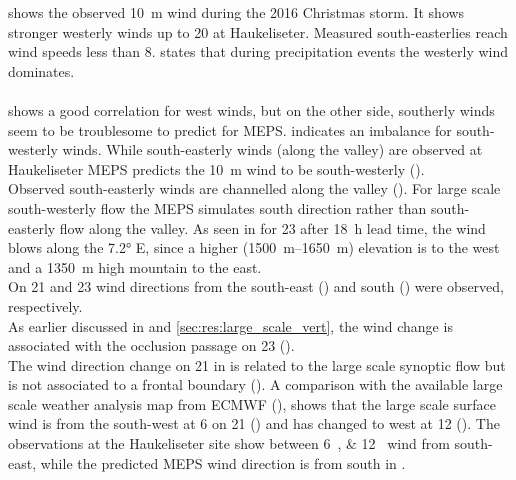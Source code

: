 \noindent
{} shows the observed \SI{10}{\metre} wind during the 2016 Christmas storm. It shows stronger westerly winds up to \SI{20}{\mPs} at Haukeliseter. Measured south-easterlies reach wind speeds less than \SI{8}{\mPs}. \citet{wolff_new_2010} states that during precipitation events the westerly wind dominates.
\\
\\
 shows a good correlation for west winds, but on the other side, southerly winds seem to be troublesome to predict for MEPS. 
 indicates an imbalance for south-westerly winds. While south-easterly winds (along the valley) are observed at Haukeliseter MEPS predicts the \SI{10}{\metre} wind to be south-westerly (). 
\\
Observed south-easterly winds are channelled along the valley (). %
For large scale south-westerly flow the MEPS simulates south direction rather than 
south-easterly flow along the valley. As seen in  for \SI{23}{\dec} after \SI{18}{\hour} lead time, the wind blows along the \ang{7.2} E, since a higher (\SIrange{1500}{1650}{\metre}) elevation is to the west and a \SI{1350}{\metre} high mountain to the east.
\\
On \num{21} and \SI{23}{\dec} wind directions from the south-east () and south () were observed, respectively.
\\
As earlier discussed in  and \ref{sec:res:large_scale_vert}, the wind change is associated with the occlusion passage on \SI{23}{\dec} ().
\\
The wind direction change on \SI{21}{\dec} in  is related to the large scale synoptic flow but is not associated to a frontal boundary (). A comparison with the available large scale weather analysis map from ECMWF (), shows that the large scale surface wind is from the south-west at \SI{6}{\UTC} on \SI{21}{\dec} () and has changed to west at \SI{12}{\UTC} (). The observations at the Haukeliseter site show between \SIlist{6;12}{\UTC} wind from south-east, while the predicted MEPS wind direction is from south in . 
